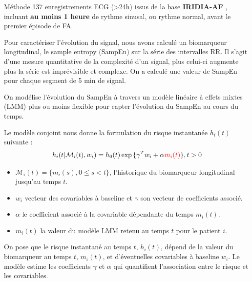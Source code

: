 \documentclass[final]{beamer}
\newlength{\colwidth}
\begin{document}
\begin{frame}[t]
\begin{columns}[t]
\begin{column}{\colwidth}
 \begin{block}{Méthode}
      137 enregistrements ECG (>24h) issus de la base \textbf{IRIDIA-AF} \cite{gilon2023iridia}, incluant \textbf{au moins 1 heure} de rythme sinusal, ou rythme normal, avant le premier épisode de FA.
    
      Pour caractériser l'évolution du signal, nous avons calculé un biomarqueur longitudinal, le sample entropy (SampEn) \cite{richman2000physiological} sur la série des intervalles RR.
      Il s'agit d'une mesure quantitative de la complexité d'un signal, plus celui-ci augmente plus la série est imprévisible et complexe.
      On a calculé une valeur de SampEn pour chaque segment de 5 min de signal.

      On modélise l'évolution du SampEn à travers un modèle linéaire à effets mixtes (LMM) plus ou moins flexible pour capter l'évolution du SampEn au cours du temps.
    
      Le modèle conjoint \cite{rizopoulos2012joint} nous donne la formulation du risque instantanée $h_{i}(t)$ suivante :
      \begin{equation}
        h_{i}(t | \mathcal{M}_{i}(t), w_{i}) = h_{0}(t)\exp{\{\gamma^{T}w_{i} + \alpha \textcolor{red}{m_{i}(t)}\}}, t > 0
      \end{equation}

      \begin{itemize}
        \item $\mathcal{M}_{i}(t) = \{m_{i}(s), 0 \leq s < t\}$, l'historique du biomarqueur longitudinal jusqu'au temps $t$.
        \item $w_{i}$ vecteur des covariables à baseline et $\gamma$ son vecteur de coefficients associé.
        \item $\alpha$ le coefficient associé à la covariable dépendante du temps $m_{i}(t)$.
        \item $m_{i}(t)$ la valeur du modèle LMM retenu au temps $t$ pour le patient $i$.
      \end{itemize}
      On pose que le risque instantané au temps $t$, $h_{i}(t)$, dépend de la valeur du biomarqueur au temps $t$, $m_{i}(t)$,
      et d'éventuelles covariables à baseline $w_i$.
      Le modèle estime les coefficients $\gamma$ et $\alpha$ qui quantifient l'association entre le risque et les covariables.


\end{block}
\end{column}
\end{columns}
\end{frame}
\end{document}
